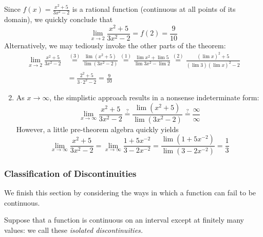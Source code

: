\begin{examples}{}{}
\exstart Since $f(x)=\frac{x^2+5}{3x^2-2}$ is a rational function (continuous at all points of its domain), we quickly conclude that
	\[\lim\limits_{x\to 2}\frac{x^2+5}{3x^2-2}=f(2)=\frac 9{10}\]
	Alternatively, we may tediously invoke the other parts of the theorem:
	\begin{align*}
	\lim\limits_{x\to 2}\frac{x^2+5}{3x^2-2}&\overset{(3)}{=} \frac{\lim(x^2+5)}{\lim(3x^2-2)} \overset{(1)}{=} \frac{\lim x^2+\lim 5}{\lim 3x^2-\lim 2} \overset{(2)}{=} \frac{(\lim x)^2+5}{(\lim 3)(\lim x)^2-2}\\
	&=\frac{2^2+5}{3\cdot 2^2-2} =\frac 9{10}
	\end{align*}
\begin{enumerate}\setcounter{enumi}{1}
	\item As $x\to\infty$, the simplistic approach results in a nonsense indeterminate form:
	\[\lim_{x\to\infty}\frac{x^2+5}{3x^2-2} \overset{\text{?}}{=} \frac{\lim(x^2+5)}{\lim(3x^2-2)} \overset{\text{?}}{=} \frac\infty\infty\]
	However, a little pre-theorem algebra quickly yields\footnotemark
\[\lim_{x\to\infty}\frac{x^2+5}{3x^2-2} =\lim_{x\to\infty}\frac{1+5x^{-2}}{3-2x^{-2}} =\frac{\lim(1+5x^{-2})}{\lim(3-2x^{-2})} =\frac 13\]
\end{enumerate}
\end{examples}


\vfil

\goodbreak


\subsubsection*{Classification of Discontinuities}

We finish this section by considering the ways in which a function can fail to be continuous.

\begin{defn}{}{}
Suppose that a function is continuous on an interval except at finitely many values: we call these \emph{isolated discontinuities.}
\end{defn}

